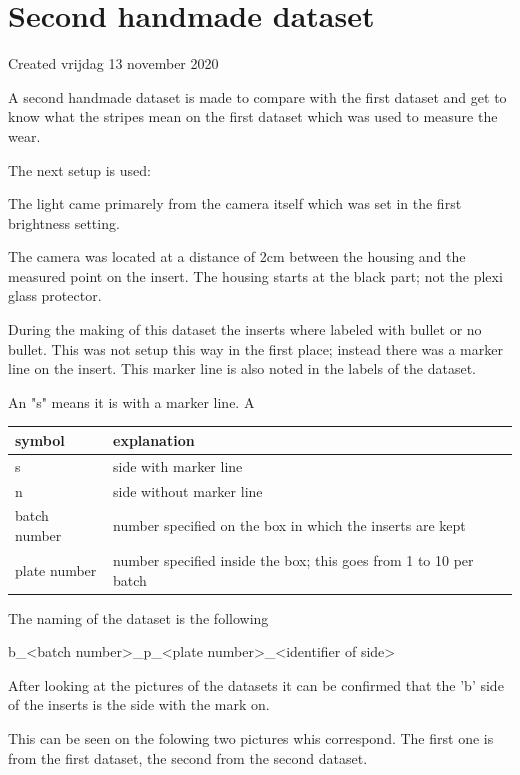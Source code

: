 		\section{Second handmade dataset}

Created vrijdag 13 november 2020



A second handmade dataset is made to compare with the first dataset and get to know what the stripes mean on the first dataset which was used to measure the wear.



The next setup is used:

The light came primarely from the camera itself which was set in the first brightness setting. 

The camera was located at a distance of 2cm between the housing and the measured point on the insert. The housing starts at the black part; not the plexi glass protector. 

During the making of this dataset the inserts where labeled with bullet or no bullet. This was not setup this way in the first place; instead there was a marker line on the insert. This marker line is also noted in the labels of the dataset.

An "s" means it is with a marker line. A

\begin{tabular}{ |l|l| }
\hline
 symbol & explanation \tabularnewline
\hline
\hline
 s & side with marker line \tabularnewline
\hline
 n & side without marker line \tabularnewline
\hline
 batch number & number specified on the box in which the inserts are kept \tabularnewline
\hline
 plate number & number specified inside the box; this goes from 1 to 10 per batch \tabularnewline
\hline
\end{tabular}


The naming of the dataset is the following

b\_\textless{}batch number\textgreater{}\_p\_\textless{}plate number\textgreater{}\_\textless{}identifier of side\textgreater{}

After looking at the pictures of the datasets it can be confirmed that the 'b' side of the inserts is the side with the mark on. 



This can be seen on the folowing two pictures whis correspond. The first one is from the first dataset, the second from the second dataset.

